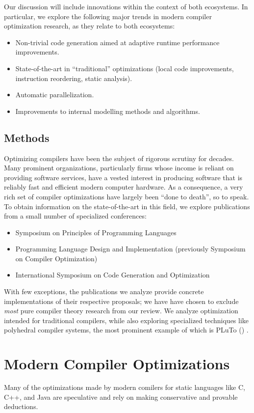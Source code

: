 \documentclass[nobib]{tufte-handout}
\newcommand{\CiteThis}{
({\color{red}{CITE THIS}})
}
\begin{document}
Our discussion will include innovations within the context of both ecosystems.  In particular, we explore the following major trends in modern compiler optimization research, as they relate to both ecosystems:
\begin{itemize}
\item Non-trivial code generation aimed at adaptive runtime performance improvements.
\item State-of-the-art in ``traditional'' optimizations (local code improvements, instruction reordering, static analysis).
\item Automatic parallelization.
\item Improvements to internal modelling methods and algorithms.
\end{itemize}



\subsection{Methods}
Optimizing compilers have been the subject of rigorous scrutiny for decades.  Many prominent organizations, particularly firms whose income is reliant on providing software services, have a vested interest in producing software that is reliably fast and efficient modern computer hardware.  As a consequence, a very rich set of compiler optimizations have largely been ``done to death'', so to speak.  To obtain information on the state-of-the-art in this field, we explore publications from a small number of specialized conferences: 
\begin{itemize}
\item Symposium on Principles of Programming Languages
\item Programming Language Design and Implementation (previously Symposium on Compiler Optimization)
\item International Symposium on Code Generation and Optimization
\end{itemize}

With few exceptions, the publications we analyze provide concrete implementations of their respective proposals; we have have chosen to exclude \emph{most} pure compiler theory research from our review.  We analyze optimization intended for traditional compilers, while also exploring specialized techniques like polyhedral compiler systems, the most prominent example of which is PLuTo \CiteThis{}.  


\section{Modern Compiler Optimizations}
Many of the optimizations made by modern comilers for static languages like C, C++, and Java are speculative and rely on making conservative and provable deductions.  
\end{document}
